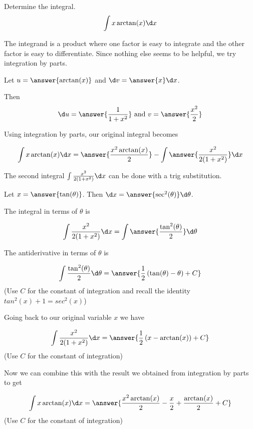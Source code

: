 \documentclass{ximera}
\author{Jason Miller}
\begin{document}
\begin{exercise}
Determine the integral.
\[
\int x\arctan(x) \d x
\]


The integrand is a product where one factor is easy to integrate and the other factor is easy to differentiate. Since nothing else seems to be helpful, we try integration by parts. 

Let $u=\answer{ \arctan(x)}$ and $\d v= \answer{  x } \d x$. 

Then 
\[
  \d u= \answer{ \frac{1}{1+x^{2}}} \text{ and }  v=\answer{ \frac{x^{2}}{2} }
\]

\begin{exercise}

Using integration by parts, our original integral becomes

\[
\int x\arctan(x) \d x=\answer{\frac{x^{2}\arctan(x)}{2}} - \int \answer{\frac{x^{2}}{2(1+x^{2})}} \d x
\]

\begin{exercise}

The second integral $\int \frac{x^{2}}{2(1+x^{2})} \d x$ can be done with a trig substitution. 

Let $x=\answer{ \tan(\theta)}$. Then $\d x=\answer{ \sec^{2}(\theta)} \d \theta$.

The integral in terms of $\theta$ is

\[
\int \frac{x^{2}}{2(1+x^{2})} \d x =\int \answer{ \frac{\tan^{2}(\theta)}{2}} \d \theta
\]

\begin{exercise}
The antiderivative in terms of $\theta$ is

\[
\int \frac{\tan^{2}(\theta)}{2} \d \theta=\answer{\frac{1}{2}\left( \tan(\theta) - \theta \right) + C }
\]
(Use $C$ for the constant of integration and recall the identity $tan^2(x)+1=sec^2(x)$)

\begin{exercise}
Going back to our original variable $x$ we have 

\[
\int \frac{x^{2}}{2(1+x^{2})} \d x=\answer{\frac{1}{2}\left( x-\arctan(x) \right) + C }
\]
(Use $C$ for the constant of integration)

\begin{exercise}

Now we can combine this with the result we obtained from integration by parts to get


\[
\int x\arctan(x) \d x=\answer{ \frac{x^{2}\arctan(x)}{2}-\frac{x}{2}+\frac{\arctan(x)}{2} + C}
\]
(Use $C$ for the constant of integration)



\end{exercise}
\end{exercise}

\end{exercise}
\end{exercise}
\end{exercise}
\end{exercise}
\end{document}
